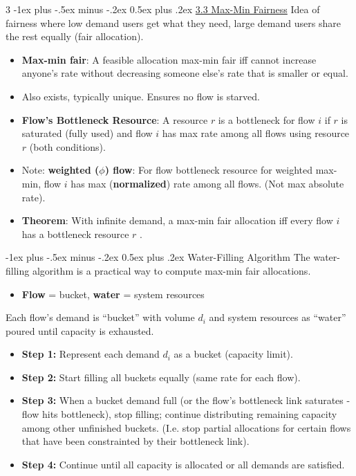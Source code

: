 \documentclass[a4paper, 9pt, landscape]{article}
\makeatletter
\renewcommand{\subsection}{\@startsection{subsubsection}{3}{0mm}%
                                {-1ex plus -.5ex minus -.2ex}%
                                {0.5ex plus .2ex}%
                                {\normalfont\small\bfseries}}
\makeatother
\begin{document}
\begin{multicols*}{3}
\subsection{\underline{3.3 Max-Min Fairness}}
Idea of fairness where low demand users get what they need, large demand users share the rest equally (fair allocation).
\begin{itemize}
	\item \textbf{Max-min fair}: A feasible allocation max-min fair iff cannot increase anyone's rate without decreasing someone else's rate that is smaller or equal.
	\item Also exists, typically unique. Ensures no flow is starved. 
	\item \textbf{Flow's Bottleneck Resource}: A resource $r$ is a bottleneck for flow $i$ if $r$ is saturated (fully used) and flow $i$ has max rate among all flows using resource $r$ (both conditions).
	\item Note: \textbf{weighted ($\phi$) flow}: For flow bottleneck resource for weighted max-min, flow $i$ has max (\textbf{normalized}) rate among all flows. (Not max absolute rate).
	\item \textbf{Theorem}: With infinite demand, a max-min fair allocation iff every flow $i$ has a bottleneck resource $r$ .
\end{itemize}

\subsection{Water-Filling Algorithm}
The water-filling algorithm is a practical way to compute max-min fair allocations.  
\begin{itemize}
	\item \textbf{Flow} = bucket, \textbf{water} = system resources
\end{itemize}
Each flow’s demand is “bucket” with volume $d_i$ and system resources as “water” poured until capacity is exhausted.  

\begin{itemize}
	\item \textbf{Step 1:} Represent each demand $d_i$ as a bucket (capacity limit).
	\item \textbf{Step 2:} Start filling all buckets equally (same rate for each flow).
	\item \textbf{Step 3:} When a bucket demand full (or the flow's bottleneck link saturates - flow hits bottleneck), stop filling; continue distributing remaining capacity among other unfinished buckets. (I.e. stop partial allocations for certain flows that have been constrainted by their bottleneck link).
	\item \textbf{Step 4:} Continue until all capacity is allocated or all demands are satisfied.
\end{itemize}


\end{multicols*}
\end{document}
